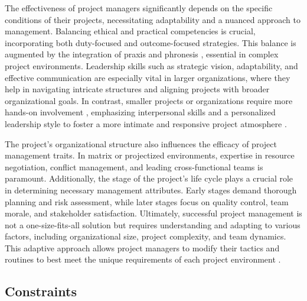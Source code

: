 \documentclass{article}
\begin{document}


The effectiveness of project managers significantly depends on the specific conditions of their projects, necessitating adaptability and a nuanced approach to management. Balancing ethical and practical competencies is crucial, incorporating both duty-focused and outcome-focused strategies. This balance is augmented by the integration of praxis and phronesis \cite{bredillet2015good}, essential in complex project environments. Leadership skills such as strategic vision, adaptability, and effective communication are especially vital in larger organizations, where they help in navigating intricate structures and aligning projects with broader organizational goals. In contrast, smaller projects or organizations require more hands-on involvement \cite{sigurdhssonpatterns}, emphasizing interpersonal skills and a personalized leadership style to foster a more intimate and responsive project atmosphere \cite{pollack2016project}.

The project's organizational structure also influences the efficacy of project management traits. In matrix or projectized environments, expertise in resource negotiation, conflict management, and leading cross-functional teams is paramount. Additionally, the stage of the project's life cycle plays a crucial role in determining necessary management attributes. Early stages demand thorough planning and risk assessment, while later stages focus on quality control, team morale, and stakeholder satisfaction. Ultimately, successful project management is not a one-size-fits-all solution but requires understanding and adapting to various factors, including organizational size, project complexity, and team dynamics. This adaptive approach allows project managers to modify their tactics and routines to best meet the unique requirements of each project environment \cite{hyvari2006success}.

\subsection{Constraints}
\end{document}
